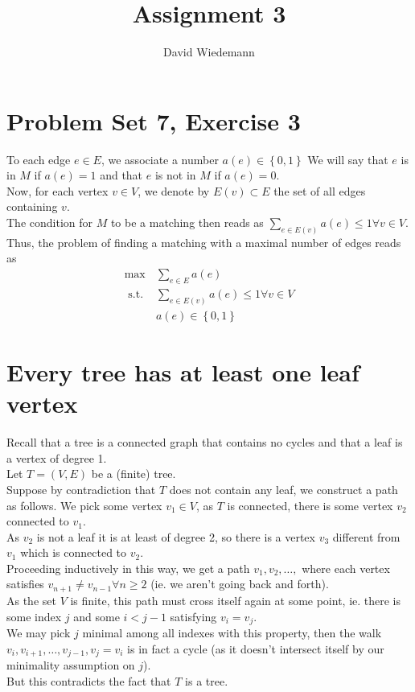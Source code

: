 \documentclass[11pt, a4paper]{article}
\begin{document}
\title{Assignment 3}
\author{David Wiedemann}
\maketitle
\section{Problem Set 7, Exercise 3}
To each edge $e\in E$, we associate a number $a( e ) \in \left\{ 0,1 \right\}  $ 
We will say that $e$ is in $M$ if $a( e ) =1$ and that $e$ is not in $M$ if $a( e  ) =0$.\\
Now, for each vertex $v\in V$, we denote by $E( v) \subset E$ the set of all edges containing $v$.\\
The condition for $M$ to be a matching then reads as $\sum_{ e \in E( v) } a( e )  \leq 1\forall  v \in V$.\\
Thus, the problem of finding a matching with a maximal number of edges reads as
\begin{align*}
	\max & \sum_{ e \in E} a( e  ) \\
	\text{ s.t. } & \sum_{e \in E( v) } a( e ) \leq 1\forall v \in V\\
		      &a( e  ) \in \left\{ 0,1 \right\} 
\end{align*}
\section{Every tree has at least one leaf vertex}
Recall that a tree is a connected graph that contains no cycles and that a leaf is a vertex of degree 1.\\
Let $T= ( V,E) $ be a (finite) tree.\\
Suppose by contradiction that $T$ does not contain any leaf, we construct a path as follows.
We pick some vertex $ v_1\in V$, as $T$ is connected, there is some vertex $v_2$ connected to $v_1$.\\
As $v_2$ is not a leaf it is at least of degree 2, so there is a vertex $v_3$ different from $v_1$ which is connected to $v_2$.\\
Proceeding inductively in this way, we get a path $v_1, v_2,\ldots, $ where each vertex satisfies $v_{n+1} \neq v_{n-1} \forall n \geq 2 $ (ie. we aren't going back and forth).\\
As the set $V$ is finite, this path must cross itself again at some point, ie. there is some index $j$ and some $i< j-1$ satisfying $v_i = v_j$.\\
We may pick $j$ minimal among all indexes with this property, then the walk $v_i, v_{i+1} , \ldots, v_{j-1} , v_j =v_i$ is in fact a cycle (as it doesn't intersect itself by our minimality assumption on $j$).\\
But this contradicts the fact that $T$ is a tree.
\end{document}
